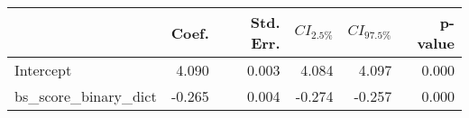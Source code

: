 \begin{tabular}{lrrrrr}
\toprule
 & Coef. & Std. Err. & $CI_{2.5\%}$ & $CI_{97.5\%}$ & p-value \\
\midrule
Intercept & 4.090 & 0.003 & 4.084 & 4.097 & 0.000 \\
bs_score_binary_dict & -0.265 & 0.004 & -0.274 & -0.257 & 0.000 \\
\bottomrule
\end{tabular}
